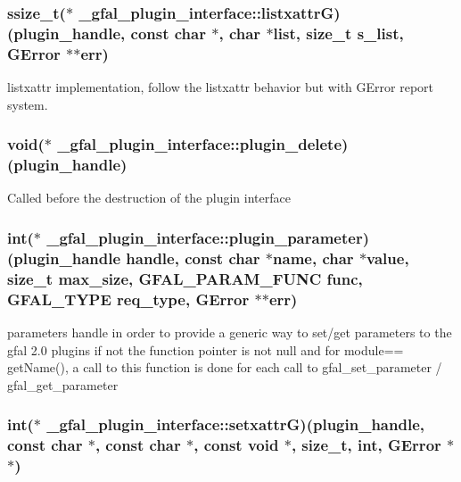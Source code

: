 \subsubsection{\setlength{\rightskip}{0pt plus 5cm}ssize\_\-t($\ast$ \bf{\_\-gfal\_\-plugin\_\-interface::listxattr\-G})(plugin\_\-handle, const char $\ast$, char $\ast$list, size\_\-t s\_\-list, GError $\ast$$\ast$err)}\label{struct__gfal__plugin__interface_c3bae2e54ce8998722f03b588d423b18}


listxattr implementation, follow the listxattr behavior but with GError report system. 
\subsubsection{\setlength{\rightskip}{0pt plus 5cm}void($\ast$ \bf{\_\-gfal\_\-plugin\_\-interface::plugin\_\-delete})(plugin\_\-handle)}\label{struct__gfal__plugin__interface_d146f62bd310f1f265f0bc3c37cc70d8}


Called before the destruction of the plugin interface 
\subsubsection{\setlength{\rightskip}{0pt plus 5cm}int($\ast$ \bf{\_\-gfal\_\-plugin\_\-interface::plugin\_\-parameter})(plugin\_\-handle handle, const char $\ast$name, char $\ast$value, size\_\-t max\_\-size, GFAL\_\-PARAM\_\-FUNC func, GFAL\_\-TYPE req\_\-type, GError $\ast$$\ast$err)}\label{struct__gfal__plugin__interface_4a4be363e714afa487e8abc21dce2ae7}


parameters handle in order to provide a generic way to set/get parameters to the gfal 2.0 plugins if not the function pointer is not null and for module== get\-Name(), a call to this function is done for each call to gfal\_\-set\_\-parameter / gfal\_\-get\_\-parameter 
\subsubsection{\setlength{\rightskip}{0pt plus 5cm}int($\ast$ \bf{\_\-gfal\_\-plugin\_\-interface::setxattr\-G})(plugin\_\-handle, const char $\ast$, const char $\ast$, const void $\ast$, size\_\-t, int, GError $\ast$$\ast$)}\label{struct__gfal__plugin__interface_2ededf4f6bc7f284ac31234110ee1444}


